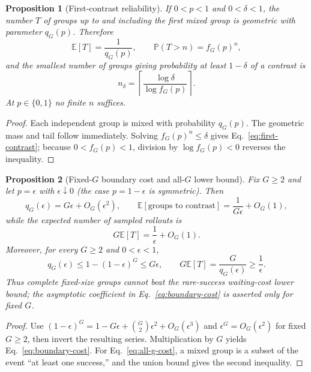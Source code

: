 \documentclass{article}
\newtheorem{proposition}{Proposition}
\newcommand{\E}{\mathbb{E}}
\newcommand{\Prob}{\mathbb{P}}
\begin{document}
\begin{proposition}[First-contrast reliability]
If $0<p<1$ and $0<\delta<1$, the number $T$ of groups up to and including the
first mixed group is geometric with parameter $q_G(p)$.  Therefore
\begin{equation}
  \E[T]=\frac{1}{q_G(p)},\qquad
  \Prob(T>n)=f_G(p)^n,
\end{equation}
and the smallest number of groups giving probability at least $1-\delta$ of a
contrast is
\begin{equation}
  n_\delta=\left\lceil\frac{\log\delta}{\log f_G(p)}\right\rceil.
  \label{eq:first-contrast}
\end{equation}
At $p\in\{0,1\}$ no finite $n$ suffices.
\end{proposition}

\begin{proof}
Each independent group is mixed with probability $q_G(p)$.  The geometric
mass and tail follow immediately.  Solving $f_G(p)^n\leq\delta$ gives
Eq.~\eqref{eq:first-contrast}; because $0<f_G(p)<1$, division by
$\log f_G(p)<0$ reverses the inequality.
\end{proof}

\begin{proposition}[Fixed-$G$ boundary cost and all-$G$ lower bound]
Fix $G\geq2$ and let $p=\epsilon$ with $\epsilon\downarrow0$ (the case
$p=1-\epsilon$ is symmetric).  Then
\begin{equation}
 q_G(\epsilon)=G\epsilon+O_G(\epsilon^2),\qquad
 \E[\text{groups to contrast}]=\frac{1}{G\epsilon}+O_G(1),
\end{equation}
while the expected number of sampled rollouts is
\begin{equation}
 G\E[T]=\frac{1}{\epsilon}+O_G(1).
 \label{eq:boundary-cost}
\end{equation}
Moreover, for every $G\geq2$ and $0<\epsilon<1$,
\begin{equation}
 q_G(\epsilon)\leq1-(1-\epsilon)^G\leq G\epsilon,
 \qquad G\E[T]=\frac{G}{q_G(\epsilon)}\geq\frac{1}{\epsilon}.
 \label{eq:all-g-cost}
\end{equation}
Thus complete fixed-size groups cannot beat the rare-success waiting-cost lower
bound; the asymptotic coefficient in Eq.~\eqref{eq:boundary-cost} is asserted
only for fixed $G$.
\end{proposition}

\begin{proof}
Use $(1-\epsilon)^G=1-G\epsilon+\binom{G}{2}\epsilon^2+O_G(\epsilon^3)$ and
$\epsilon^G=O_G(\epsilon^2)$ for fixed $G\geq2$, then invert the resulting
series.  Multiplication by $G$ yields Eq.~\eqref{eq:boundary-cost}.  For
Eq.~\eqref{eq:all-g-cost}, a mixed group is a subset of the event ``at least one
success,'' and the union bound gives the second inequality.
\end{proof}
\end{document}
